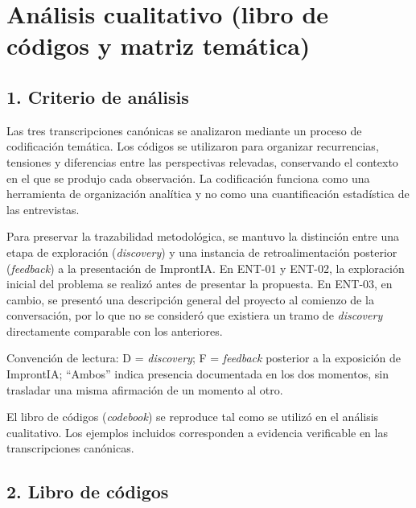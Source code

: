 \chapter{Análisis cualitativo (libro de códigos y matriz temática)}
\label{apx:cualitativo}

\section*{1. Criterio de análisis}
Las tres transcripciones canónicas se analizaron mediante un proceso de codificación temática. Los códigos se utilizaron para organizar recurrencias, tensiones y diferencias entre las perspectivas relevadas, conservando el contexto en el que se produjo cada observación. La codificación funciona como una herramienta de organización analítica y no como una cuantificación estadística de las entrevistas.

Para preservar la trazabilidad metodológica, se mantuvo la distinción entre una etapa de exploración (\textit{discovery}) y una instancia de retroalimentación posterior (\textit{feedback}) a la presentación de ImprontIA. En ENT-01 y ENT-02, la exploración inicial del problema se realizó antes de presentar la propuesta. En ENT-03, en cambio, se presentó una descripción general del proyecto al comienzo de la conversación, por lo que no se consideró que existiera un tramo de \textit{discovery} directamente comparable con los anteriores.

Convención de lectura: D = \textit{discovery}; F = \textit{feedback} posterior a la exposición de ImprontIA; ``Ambos'' indica presencia documentada en los dos momentos, sin trasladar una misma afirmación de un momento al otro.

El libro de códigos (\textit{codebook}) se reproduce tal como se utilizó en el análisis cualitativo. Los ejemplos incluidos corresponden a evidencia verificable en las transcripciones canónicas.

\section*{2. Libro de códigos}

